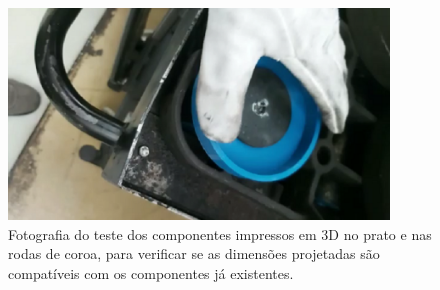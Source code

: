 \begin{figure}[htb]
    \centering
    \includegraphics[width = 0.9\textwidth]{Figures/Cap3/Teste_impressao_largo.png}
    \caption[Teste dos componentes impressos em 3D no prato e nas rodas de coroa]%
    {Fotografia do teste dos componentes impressos em 3D no prato e nas rodas de coroa, para verificar se as dimensões projetadas são compatíveis com os componentes já existentes.}
    \label{fig:teste_impressao_3d}
\end{figure}
\newpage
